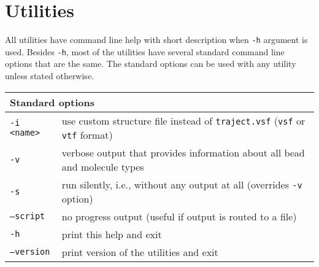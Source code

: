 \chapter{Utilities} \label{chap:Utils}

All utilities have command line help with short description when
\texttt{-h} argument is used. Besides \texttt{-h}, most of the utilities
have several standard command line options that are the same. The standard
options can be used with any utility unless stated otherwise.

\vspace{1em}
\noindent
\begin{tabular}{p{}p{}}
  \toprule
  \multicolumn{2}{l}{Standard options} \\
  \midrule
  \texttt{-i <name>} & use custom structure file instead of
    \texttt{traject.vsf} (\texttt{vsf} or \texttt{vtf} format) \\
  \texttt{-v}        & verbose output that provides information about all
    bead and molecule types \\
  \texttt{-s}        & run silently, i.e., without any output at all
    (overrides \texttt{-v} option) \\
  \texttt{--script}  & no progress output (useful if output is routed to a
    file) \\
  \texttt{-h}        & print this help and exit \\
  \texttt{--version} & print version of the utilities and exit \\
  \bottomrule
\end{tabular}





























